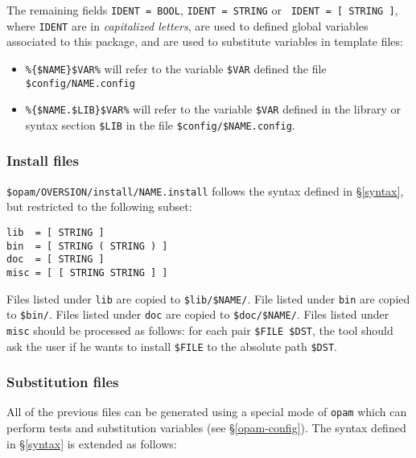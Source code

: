 \documentclass[a4paper,11pt]{article}
\begin{document}
The remaining fields {\tt IDENT = BOOL}, {\tt IDENT = STRING} or {\tt
  IDENT = [ STRING ]}, where {\tt IDENT} are in {\em capitalized
  letters}, are used to defined global variables associated to this
package, and are used to substitute variables in template files:

\begin{itemize}
\item \verb+%{$NAME}$VAR%+ will refer to the variable \verb+$VAR+
  defined the file \verb+$config/NAME.config+
\item \verb+%{$NAME.$LIB}$VAR%+ will refer to the variable \verb+$VAR+
  defined in the library or syntax section \verb+$LIB+ in the file
  \verb+$config/$NAME.config+.
\end{itemize}

\subsubsection{Install files}
\label{install}

\verb+$opam/OVERSION/install/NAME.install+ follows the syntax defined
in \S\ref{syntax}, but restricted to the following subset:

\begin{verbatim}
lib  = [ STRING ]
bin  = [ STRING ( STRING ) ]
doc  = [ STRING ]
misc = [ [ STRING STRING ] ]
\end{verbatim}

Files listed under {\tt lib} are copied to \verb+$lib/$NAME/+. File
listed under {\tt bin} are copied to \verb+$bin/+.
Files listed under {\tt doc} are copied to \verb+$doc/$NAME/+.
Files listed under {\tt misc} should be processed as
follows: for each pair \verb+$FILE $DST+, the tool should ask the user if
he wants to install \verb+$FILE+ to the absolute path \verb+$DST+.

\subsubsection{Substitution files}
\label{subst}

All of the previous files can be generated using a special mode of
{\tt opam} which can perform tests and substitution variables (see
\S\ref{opam-config}). The syntax defined in \S\ref{syntax} is extended
as follows:
\end{document}
